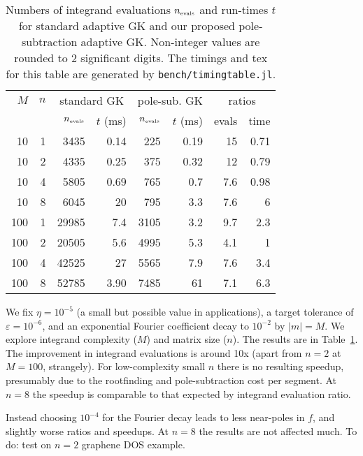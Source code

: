 \documentclass[11pt]{article}
\newcommand{\ca}[2]{\caption{#1 \label{#2}}}
\newcommand{\tbox}[1]{{\mbox{\tiny #1}}}
\newcommand{\eps}{\varepsilon}
\begin{document}
\begin{table}   %
  \centering
  \begin{tabular}{r|r|rr|rr|rr|}
  $M$ & $n$ & \multicolumn{2}{c}{standard GK} & \multicolumn{2}{c}{pole-sub. GK} & \multicolumn{2}{c}{ratios}\\
  && $n_\tbox{evals}$ & $t$ (ms) & $n_\tbox{evals}$ & $t$ (ms) & evals & time\\
  \hline
10 & 1 & 3435 & 0.14 & 225 & 0.19 & 15 & 0.71\\ 
10 & 2 & 4335 & 0.25 & 375 & 0.32 & 12 & 0.79\\ 
10 & 4 & 5805 & 0.69 & 765 & 0.7 & 7.6 & 0.98\\ 
10 & 8 & 6045 & 20 & 795 & 3.3 & 7.6 & 6\\
\hline
100 & 1 & 29985 & 7.4 & 3105 & 3.2 & 9.7 & 2.3\\ 
100 & 2 & 20505 & 5.6 & 4995 & 5.3 & 4.1 & 1\\ 
100 & 4 & 42525 & 27 & 5565 & 7.9 & 7.6 & 3.4\\ 
100 & 8 & 52785 & 3.90 & 7485 & 61 & 7.1 & 6.3\\ 
\hline
\end{tabular}
\ca{Numbers of integrand evaluations $n_\tbox{evals}$ and run-times $t$ for
  standard adaptive GK and our proposed pole-subtraction adaptive GK.
  Non-integer values are rounded to 2 significant digits.
The timings and tex for this table are generated by {\tt bench/timingtable.jl}.
}{t:time}
\end{table}

We fix $\eta=10^{-5}$ (a small but possible value in applications),
a target tolerance of $\eps=10^{-6}$,
and an exponential Fourier coefficient decay to $10^{-2}$ by $|m|=M$.
We explore integrand complexity ($M$) and matrix size ($n$).
The results are in Table~\ref{t:time}.
The improvement in integrand evaluations is around 10x (apart from $n=2$ at $M=100$,
strangely).
For low-complexity small $n$ there is no resulting speedup, presumably
due to the rootfinding and pole-subtraction cost per segment.
At $n=8$ the speedup is comparable to that expected by integrand evaluation ratio.

Instead choosing $10^{-4}$ for the Fourier decay leads to less near-poles in $f$,
and slightly worse ratios and speedups. At $n=8$ the results are not affected much.
To do: test on $n=2$ graphene DOS example.
\end{document}
